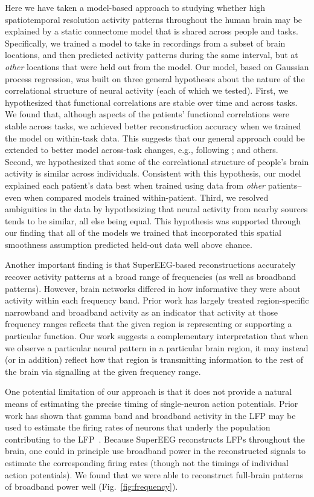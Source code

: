 \documentclass[11pt]{article}
\begin{document}
Here we have taken a model-based approach to studying whether high
spatiotemporal resolution activity patterns throughout the human brain may be
explained by a static connectome model that is shared across people and tasks.
Specifically, we trained a model to take in recordings from a subset of brain
locations, and then predicted activity patterns during the same interval, but at
\textit{other} locations that were held out from the model.  Our model, based on
Gaussian process regression, was built on three general hypotheses about the
nature of the correlational structure of neural activity (each of which we
tested).  First, we hypothesized that functional correlations are stable over
time and across tasks.  We found that, although aspects of the patients'
functional correlations were stable across tasks, we achieved better
reconstruction accuracy when we trained the model on within-task data. This
suggests that our general approach could be extended to better model across-task
changes, e.g., following \cite{ColeEtal16, TavoEtal16}; and others. Second, we
hypothesized that some of the correlational structure of people's brain activity
is similar across individuals.  Consistent with this hypothesis, our model
explained each patient's data best when trained using data from \textit{other}
patients-- even when compared models trained within-patient. Third, we
resolved ambiguities in the data by hypothesizing that neural activity from
nearby sources tends to be similar, all else being equal.  This hypothesis
was supported through our finding that all of the models we trained that
incorporated this spatial smoothness assumption predicted held-out data well
above chance.

Another important finding is that SuperEEG-based reconstructions accurately
recover activity patterns at a broad range of frequencies (as well as broadband
patterns).  However, brain networks differed in how informative they were about
activity within each frequency band.  Prior work has largely treated
region-specific narrowband and broadband activity as an indicator that activity
at those frequency ranges reflects that the given region is representing or
supporting a particular function.  Our work suggests a complementary
interpretation that when we observe a particular neural pattern in a particular
brain region, it may instead (or in addition) reflect how that region is
transmitting information to the rest of the brain via signalling at the given
frequency range.

One potential limitation of our approach is that it does not provide a natural
means of estimating the precise timing of single-neuron action potentials. Prior
work has shown that gamma band and broadband activity in the LFP may be used to
estimate the firing rates of neurons that underly the population contributing to
the LFP~\citep{MillEtal08, MannEtal09, JacoEtal10b, CronEtal11}. Because
SuperEEG reconstructs LFPs throughout the brain, one could in principle use
broadband power in the reconstructed signals to estimate the corresponding
firing rates (though not the timings of individual action potentials).  We found
that we were able to reconstruct full-brain patterns of broadband power well
(Fig.~\ref{fig:frequency}).
\end{document}
